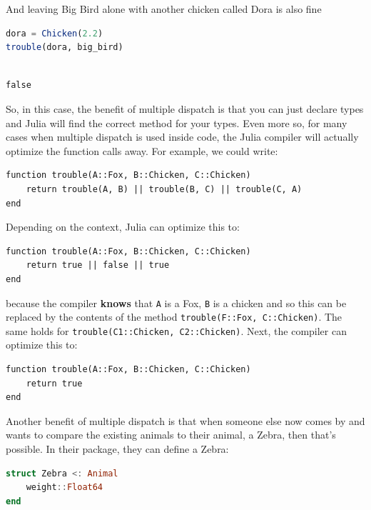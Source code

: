 \documentclass[
  notoc %
]{tufte-book}
\newcommand{\passthrough}[1]{#1}
\begin{document}
And leaving Big Bird alone with another chicken called Dora is also fine

\begin{lstlisting}[language=Julia]
dora = Chicken(2.2)
trouble(dora, big_bird)
\end{lstlisting}

\begin{lstlisting}[language=Output]

false

\end{lstlisting}

So, in this case, the benefit of multiple dispatch is that you can just
declare types and Julia will find the correct method for your types.
Even more so, for many cases when multiple dispatch is used inside code,
the Julia compiler will actually optimize the function calls away. For
example, we could write:

\begin{lstlisting}
function trouble(A::Fox, B::Chicken, C::Chicken)
    return trouble(A, B) || trouble(B, C) || trouble(C, A)
end
\end{lstlisting}

Depending on the context, Julia can optimize this to:

\begin{lstlisting}
function trouble(A::Fox, B::Chicken, C::Chicken)
    return true || false || true
end
\end{lstlisting}

because the compiler \textbf{knows} that \passthrough{\lstinline!A!} is
a Fox, \passthrough{\lstinline!B!} is a chicken and so this can be
replaced by the contents of the method
\passthrough{\lstinline!trouble(F::Fox, C::Chicken)!}. The same holds
for \passthrough{\lstinline!trouble(C1::Chicken, C2::Chicken)!}. Next,
the compiler can optimize this to:

\begin{lstlisting}
function trouble(A::Fox, B::Chicken, C::Chicken)
    return true
end
\end{lstlisting}

Another benefit of multiple dispatch is that when someone else now comes
by and wants to compare the existing animals to their animal, a Zebra,
then that's possible. In their package, they can define a Zebra:

\begin{lstlisting}[language=Julia]
struct Zebra <: Animal
    weight::Float64
end
\end{lstlisting}
\end{document}

